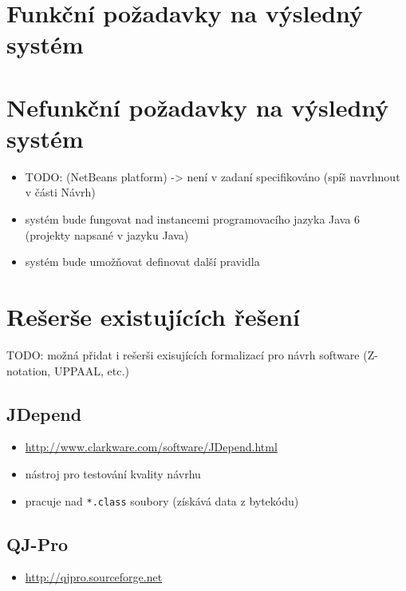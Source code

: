 \section{Funkční požadavky na výsledný systém}

\section{Nefunkční požadavky na výsledný systém}
\begin{itemize}
\item TODO: (NetBeans platform) -> není v zadaní specifikováno (spíš navrhnout v části Návrh)
\item systém bude fungovat nad instancemi programovacího jazyka Java 6 (projekty napsané v jazyku Java)
\item systém bude umožňovat definovat další pravidla
\end{itemize}

\section{Rešerše existujících řešení}

TODO: možná přidat i rešerši exisujících formalizací pro návrh software (Z-notation, UPPAAL, etc.)

\label{requirements-existing_tools}

\subsection{JDepend}

\begin{itemize}
\item \href{http://www.clarkware.com/software/JDepend.html}{http://www.clarkware.com/software/JDepend.html}
\item nástroj pro testování kvality návrhu
\item pracuje nad \verb+*.class+ soubory (získává data z bytekódu)
\end{itemize}

\subsection{QJ-Pro}
\begin{itemize}
\item \href{http://qjpro.sourceforge.net}{http://qjpro.sourceforge.net}
\end{itemize}

